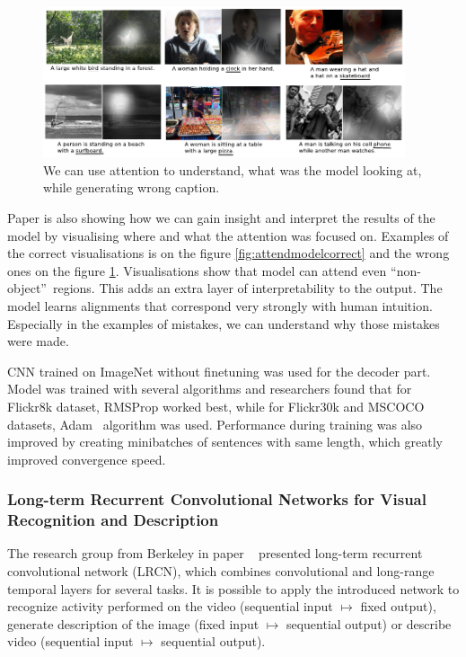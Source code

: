 \begin{figure}[!t]
	\centering
	\includegraphics[width=0.95\textwidth]{./fig/show-attend-tell_example-wrong.pdf}
	\caption{We can use attention to understand, what was the model looking at, while generating wrong caption.~\cite{DBLP:journals/corr/XuBKCCSZB15}
		\label{fig:attendmodelwrong}}
\end{figure}

Paper is also showing how we can gain insight and interpret the results of the model by visualising where and what the attention was focused on. Examples of the correct visualisations is on the figure \ref{fig:attendmodelcorrect} and the wrong ones on the figure \ref{fig:attendmodelwrong}. Visualisations show that model can attend even \textquotedblleft non-object\textquotedblright\ regions. This adds an extra layer of interpretability to the output. The model learns alignments that correspond very strongly with human intuition. Especially in the examples of mistakes, we can understand why those mistakes were made.

CNN trained on ImageNet without finetuning was used for the decoder part. Model was trained with several algorithms and researchers found that for Flickr8k dataset, RMSProp worked best, while for Flickr30k and MSCOCO datasets, Adam~\cite{DBLP:journals/corr/KingmaB14} algorithm was used. Performance during training was also improved by creating minibatches of sentences with same length, which greatly improved convergence speed.

\subsubsection{Long-term Recurrent Convolutional Networks for Visual Recognition and Description}

The research group from Berkeley in paper ~\cite{DBLP:journals/corr/DonahueHGRVSD14} presented long-term recurrent convolutional network (LRCN), which combines convolutional and long-range temporal layers for several tasks. It is possible to apply the introduced network to recognize activity performed on the video (sequential input $ \mapsto $ fixed output), generate description  of the image (fixed input $ \mapsto $ sequential output) or describe video (sequential input $ \mapsto $ sequential output).

